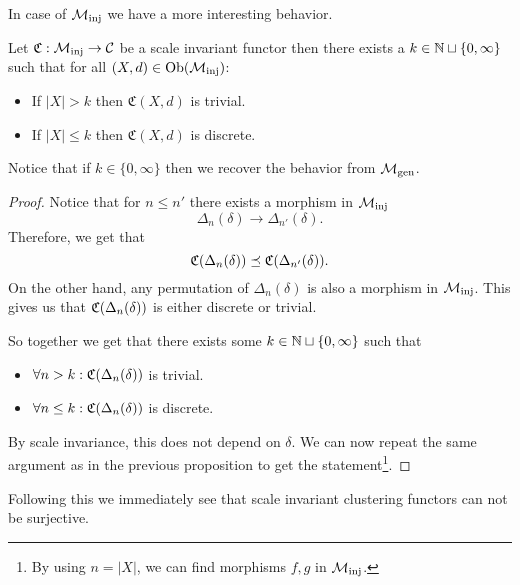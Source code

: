 In case of ${\mathcal{M}_\mathrm{inj}}$ we have a more interesting behavior.

\begin{proposition}{\cite[Thm.~6.6]{Carlsson2010}}{}
    Let $\mathfrak{C}: {\mathcal{M}_\mathrm{inj}} \to \mathcal{C}$ be a scale invariant functor then there exists a $k \in \mathbb N \sqcup \{0, \infty\}$ such that for all $(X,d) \in \mathrm {Ob}({\mathcal{M}_\mathrm{inj}})$:

    \begin{itemize}
        \item If $|X| > k$ then $\mathfrak{C}(X,d)$ is trivial.
        \item If $|X| \le k$ then $\mathfrak{C}(X,d)$ is discrete.
    \end{itemize}

    Notice that if $k \in \{0, \infty\}$ then we recover the behavior from ${\mathcal{M}_\mathrm{gen}}$.
\end{proposition}

\begin{proof}   
    Notice that for $n \le n'$ there exists a morphism in ${\mathcal{M}_\mathrm{inj}}$
    $$
    \Delta_n(\delta) \longrightarrow \Delta_{n'}(\delta).
    $$
    Therefore, we get that
    $$
    \mathfrak{C}(\Delta_n(\delta)) \preceq \mathfrak{C}(\Delta_{n'}(\delta)).
    $$
    On the other hand, any permutation of $\Delta_n(\delta)$ is also a morphism in ${\mathcal{M}_\mathrm{inj}}$. This gives us that $\mathfrak{C}(\Delta_n(\delta))$ is either discrete or trivial.

    So together we get that there exists some $k \in \mathbb N \sqcup \{0, \infty\}$ such that
    \begin{itemize}
        \item $\forall n > k: \mathfrak{C}(\Delta_n(\delta))$ is trivial.
        \item $\forall n \le k: \mathfrak{C}(\Delta_n(\delta))$ is discrete.
    \end{itemize}
    By scale invariance, this does not depend on $\delta$. We can now repeat the same argument as in the previous proposition to get the statement\footnote{By using $n = |X|$, we can find morphisms $f,g$ in ${\mathcal{M}_\mathrm{inj}}$.}.
\end{proof}

Following this we immediately see that scale invariant clustering functors can not be surjective.